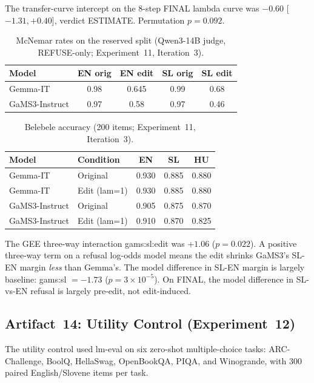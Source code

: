 \documentclass[11pt,letterpaper]{article}
\begin{document}
The transfer-curve intercept on the 8-step FINAL lambda curve was $-0.60$ [$-1.31, +0.40$], verdict ESTIMATE. Permutation $p = 0.092$.

\begin{table}[!htbp]
\centering
\caption{McNemar rates on the reserved split (Qwen3-14B judge, REFUSE-only; Experiment~11, Iteration~3).}
\label{tab:exp11_rates}
\begin{tabular}{lcccc}
\toprule
Model & EN orig & EN edit & SL orig & SL edit \\
\midrule
Gemma-IT & 0.98 & 0.645 & 0.99 & 0.68 \\
GaMS3-Instruct & 0.97 & 0.58 & 0.97 & 0.46 \\
\bottomrule
\end{tabular}
\end{table}

\begin{table}[!htbp]
\centering
\caption{Belebele accuracy (200 items; Experiment~11, Iteration~3).}
\label{tab:belebele_exp11}
\begin{tabular}{llccc}
\toprule
Model & Condition & EN & SL & HU \\
\midrule
Gemma-IT & Original & 0.930 & 0.885 & 0.880 \\
Gemma-IT & Edit (lam=1) & 0.930 & 0.885 & 0.880 \\
GaMS3-Instruct & Original & 0.905 & 0.875 & 0.870 \\
GaMS3-Instruct & Edit (lam=1) & 0.910 & 0.870 & 0.825 \\
\bottomrule
\end{tabular}
\end{table}

The GEE three-way interaction gams:sl:edit was $+1.06$ ($p = 0.022$). A positive three-way term on a refusal log-odds model means the edit shrinks GaMS3's SL-EN margin \emph{less} than Gemma's. The model difference in SL-EN margin is largely baseline: gams:sl $= -1.73$ ($p = 3\times 10^{-5}$). On FINAL, the model difference in SL-vs-EN refusal is largely pre-edit, not edit-induced.


\subsection{Artifact~14: Utility Control (Experiment~12)}
\label{gen_art_experiment_12}

The utility control used lm-eval on six zero-shot multiple-choice tasks: ARC-Challenge, BoolQ, HellaSwag, OpenBookQA, PIQA, and Winogrande, with 300 paired English/Slovene items per task.
\end{document}
